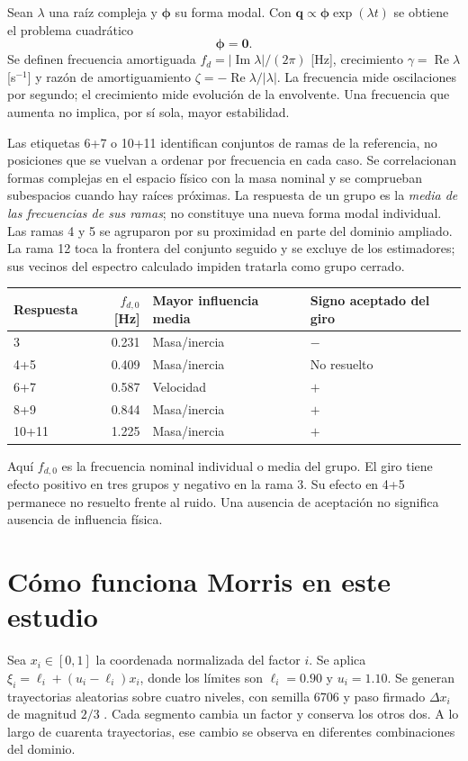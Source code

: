 Sean $\lambda$ una raíz compleja y $\boldsymbol\phi$ su forma modal. Con $\boldsymbol q\propto\boldsymbol\phi\exp(\lambda t)$ se obtiene el problema cuadrático
\begin{equation}
[\lambda^2\mathsf M+\lambda\mathsf D+\mathsf K]\boldsymbol\phi=\boldsymbol 0.
\end{equation}
Se definen frecuencia amortiguada $f_d=|\operatorname{Im}\lambda|/(2\pi)$ [Hz], crecimiento $\gamma=\operatorname{Re}\lambda$ [s$^{-1}$] y razón de amortiguamiento $\zeta=-\operatorname{Re}\lambda/|\lambda|$. La frecuencia mide oscilaciones por segundo; el crecimiento mide evolución de la envolvente. Una frecuencia que aumenta no implica, por sí sola, mayor estabilidad.

Las etiquetas 6+7 o 10+11 identifican conjuntos de ramas de la referencia, no posiciones que se vuelvan a ordenar por frecuencia en cada caso. Se correlacionan formas complejas en el espacio físico con la masa nominal y se comprueban subespacios cuando hay raíces próximas. La respuesta de un grupo es la \emph{media de las frecuencias de sus ramas}; no constituye una nueva forma modal individual. Las ramas 4 y 5 se agruparon por su proximidad en parte del dominio ampliado. La rama 12 toca la frontera del conjunto seguido y se excluye de los estimadores; sus vecinos del espectro calculado impiden tratarla como grupo cerrado.

\begin{center}\small
\begin{tabular}{lrlp{3cm}}
\toprule Respuesta & $f_{d,0}$ [Hz] & Mayor influencia media & Signo aceptado del giro \\ \midrule
3 & 0.231 & Masa/inercia & $-$ \\
4+5 & 0.409 & Masa/inercia & No resuelto \\
6+7 & 0.587 & Velocidad & $+$ \\
8+9 & 0.844 & Masa/inercia & $+$ \\
10+11 & 1.225 & Masa/inercia & $+$ \\

\bottomrule
\end{tabular}
\end{center}
Aquí $f_{d,0}$ es la frecuencia nominal individual o media del grupo. El giro tiene efecto positivo en tres grupos y negativo en la rama 3. Su efecto en 4+5 permanece no resuelto frente al ruido. Una ausencia de aceptación no significa ausencia de influencia física.

\section{Cómo funciona Morris en este estudio}
Sea $x_i\in[0,1]$ la coordenada normalizada del factor $i$. Se aplica $\xi_i=\ell_i+(u_i-\ell_i)x_i$, donde los límites son $\ell_i=0.90$ y $u_i=1.10$. Se generan trayectorias aleatorias sobre cuatro niveles, con semilla 6706 y paso firmado $\Delta x_i$ de magnitud $2/3$ \cite{morris1991}. Cada segmento cambia un factor y conserva los otros dos. A lo largo de cuarenta trayectorias, ese cambio se observa en diferentes combinaciones del dominio.

